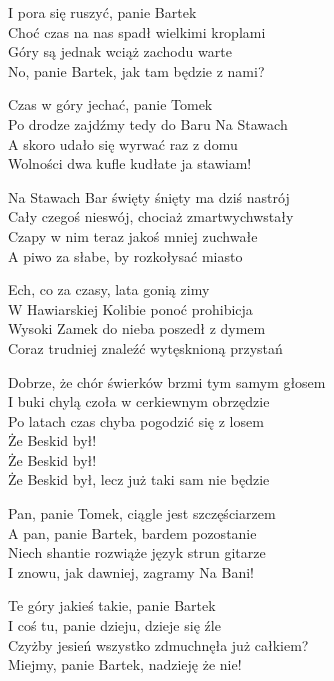 \begin{text}
    \begin{scriptTwelve}
    I pora się ruszyć, panie Bartek\\
    Choć czas na nas spadł wielkimi kroplami\\
    Góry są jednak wciąż zachodu warte\\
    No, panie Bartek, jak tam będzie z nami?

    Czas w góry jechać, panie Tomek\\
    Po drodze zajdźmy tedy do Baru Na Stawach\\
    A skoro udało się wyrwać raz z domu\\
    Wolności dwa kufle kudłate ja stawiam!

    Na Stawach Bar święty śnięty ma dziś nastrój\\
    Cały czegoś nieswój, chociaż zmartwychwstały\\
    Czapy w nim teraz jakoś mniej zuchwałe\\
    A piwo za słabe, by rozkołysać miasto

    Ech, co za czasy, lata gonią zimy\\
    W Hawiarskiej Kolibie ponoć prohibicja\\
    Wysoki Zamek do nieba poszedł z dymem\\
    Coraz trudniej znaleźć wytęsknioną przystań

    Dobrze, że chór świerków brzmi tym samym głosem\\
    I buki chylą czoła w cerkiewnym obrzędzie\\
    Po latach czas chyba pogodzić się z losem\\
    Że Beskid był!\\
    Że Beskid był!\\
    Że Beskid był, lecz już taki sam nie będzie

    Pan, panie Tomek, ciągle jest szczęściarzem\\
    A pan, panie Bartek, bardem pozostanie\\
    Niech shantie rozwiąże język strun gitarze\\
    I znowu, jak dawniej, zagramy Na Bani!

    Te góry jakieś takie, panie Bartek\\
    I coś tu, panie dzieju, dzieje się źle\\
    Czyżby jesień wszystko zdmuchnęła już całkiem?\\
    Miejmy, panie Bartek, nadzieję że nie!


\end{scriptTwelve}
\end{text}
